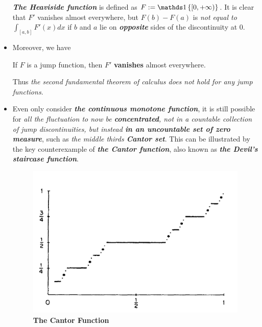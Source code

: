\documentclass[11pt]{article}
\begin{document}
\begin{itemize}
\begin{example}
\emph{\textbf{The Heaviside function}} is defined as $F := \ind{[0,+\infty)}$. It is clear that $F'$ vanishes almost everywhere, but $F(b) − F(a)$ is
\emph{not equal to} $\int_{[a,b]} F'(x) dx$ if $b$ and $a$ lie on \emph{\textbf{opposite}} sides of the discontinuity at $0$.
\end{example}

\item Moreover, we have
 \begin{proposition}
If $F$ is a jump function, then $F'$ \textbf{vanishes} almost everywhere.
\end{proposition} Thus \emph{the second fundamental theorem of calculus does not hold for any jump functions}.

\item \begin{remark}
Even only consider \emph{\textbf{the continuous monotone function}}, it is still possible for \emph{all the fluctuation to now be \textbf{concentrated}, not in a countable collection of jump discontinuities, but instead \textbf{in an uncountable set of zero measure}}, such as \emph{the middle thirds \textbf{Cantor set}}. This
can be illustrated by the key counterexample of \emph{\textbf{the Cantor function}}, also known as \emph{\textbf{the Devil's staircase function}}.

\begin{figure}
\begin{minipage}[t]{1\linewidth}
  \centering
  \centerline{\includegraphics[scale = 0.5]{cantor_function.png}}
\end{minipage}
\caption{\footnotesize{\textbf{The Cantor Function \citep{reed1980methods}}}}
\label{fig: cantor_function}
\end{figure}





\end{remark}
\end{itemize}
\end{document}
